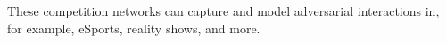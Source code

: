 \documentclass[preview]{standalone}
\begin{document}
These competition networks can capture and model adversarial interactions in, for example, eSports, reality shows, and more.\\
\end{document}
